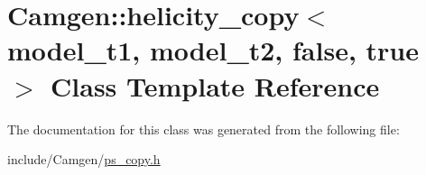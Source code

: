 \hypertarget{a00268}{}\section{Camgen\+:\+:helicity\+\_\+copy$<$ model\+\_\+t1, model\+\_\+t2, false, true $>$ Class Template Reference}
\label{a00268}


The documentation for this class was generated from the following file\+:\begin{DoxyCompactItemize}
\item 
include/\+Camgen/\hyperlink{a00740}{ps\+\_\+copy.\+h}\end{DoxyCompactItemize}
